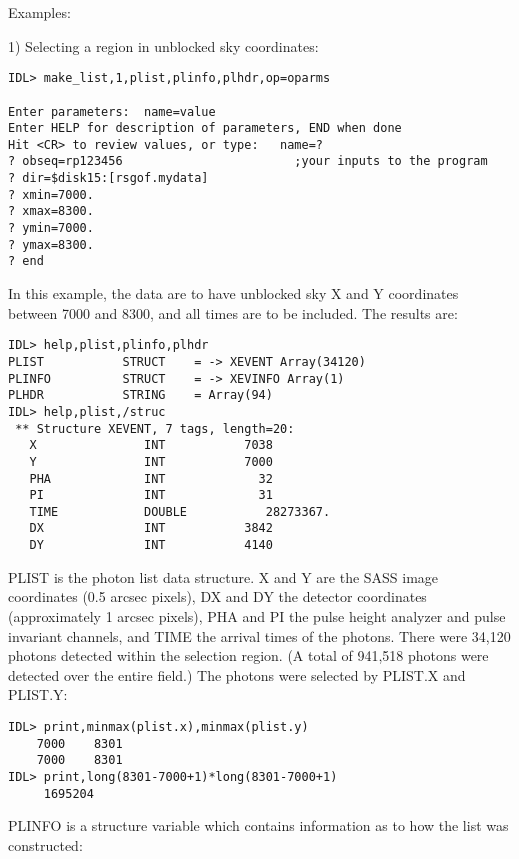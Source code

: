  
Examples:
 
1) Selecting a region in unblocked sky coordinates:

\medskip\noindent
\begin{verbatim}
IDL> make_list,1,plist,plinfo,plhdr,op=oparms
 
Enter parameters:  name=value
Enter HELP for description of parameters, END when done
Hit <CR> to review values, or type:   name=?
? obseq=rp123456                        ;your inputs to the program
? dir=$disk15:[rsgof.mydata]
? xmin=7000.
? xmax=8300.
? ymin=7000.
? ymax=8300.
? end
\end{verbatim}
In this example, the data are to have unblocked sky X and Y coordinates
between 7000 and 8300, and all times are to be included. The results are:

\medskip\noindent
\begin{verbatim}
IDL> help,plist,plinfo,plhdr
PLIST           STRUCT    = -> XEVENT Array(34120)
PLINFO          STRUCT    = -> XEVINFO Array(1)
PLHDR           STRING    = Array(94)
IDL> help,plist,/struc
 ** Structure XEVENT, 7 tags, length=20:
   X               INT           7038
   Y               INT           7000
   PHA             INT             32
   PI              INT             31
   TIME            DOUBLE           28273367.
   DX              INT           3842
   DY              INT           4140
\end{verbatim}
PLIST is the photon list data structure. X and Y are the SASS image coordinates
(0.5 arcsec pixels), DX and DY the detector coordinates (approximately 1 arcsec
pixels), PHA and PI the pulse height analyzer and pulse invariant channels, and
TIME the arrival times of the photons. There were 34,120 photons detected
within the selection region. (A total of 941,518 photons were detected over the
entire field.) The photons were selected by PLIST.X and PLIST.Y:

\medskip\noindent
\begin{verbatim}
IDL> print,minmax(plist.x),minmax(plist.y)
    7000    8301
    7000    8301
IDL> print,long(8301-7000+1)*long(8301-7000+1)
     1695204
\end{verbatim}
PLINFO is a structure variable which contains information as to how the
list was constructed:

